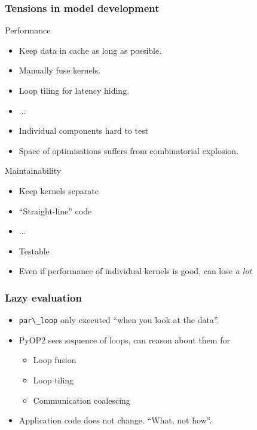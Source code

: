 \documentclass[presentation]{beamer}
\begin{document}
\begin{frame}[allowframebreaks]
  \frametitle{Tensions in model development}

  \begin{block}{Performance}
    \begin{itemize}
    \item Keep data in cache as long as possible.  
    \item Manually fuse kernels.
    \item Loop tiling for latency hiding.
    \item ...
    \item Individual components hard to test
    \item Space of optimisations suffers from combinatorial
      explosion.
    \end{itemize}
  \end{block}

\pagebreak
  \begin{block}{Maintainability}
    \begin{itemize}
    \item Keep kernels separate
    \item ``Straight-line'' code
    \item ...
    \item Testable
    \item Even if performance of individual kernels is good, can lose
      \emph{a lot}
    \end{itemize}
  \end{block}

\end{frame}
\begin{frame}
  \frametitle{Lazy evaluation}
    \begin{itemize}
    \item \verb~par\_loop~ only executed ``when you look at the
      data''.
    \item PyOP2 sees sequence of loops, can reason about them for
      \begin{itemize}
      \item Loop fusion
      \item Loop tiling
      \item Communication coalescing
      \end{itemize}
    \item Application code does not change.  ``What, not how''.
    \end{itemize}
\end{frame}
\end{document}
